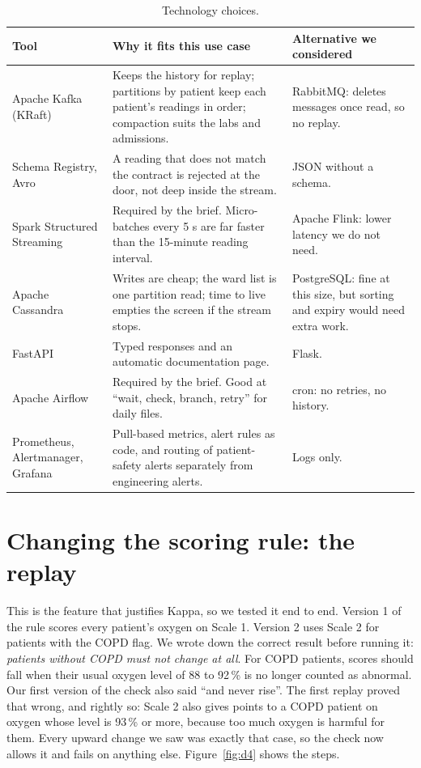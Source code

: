 \documentclass[11pt,a4paper]{article}
\begin{document}
\begin{table}[H]\centering\small
\begin{tabularx}{\linewidth}{|l|X|X|}
\hline
\rowcolor{tablehead}\textbf{Tool} & \textbf{Why it fits this use case} & \textbf{Alternative we considered} \\ \hline
Apache Kafka (KRaft) & Keeps the history for replay; partitions by patient keep
each patient's readings in order; compaction suits the labs and admissions. &
RabbitMQ: deletes messages once read, so no replay. \\ \hline
Schema Registry, Avro & A reading that does not match the contract is rejected at the
door, not deep inside the stream. & JSON without a schema. \\ \hline
Spark Structured Streaming & Required by the brief. Micro-batches every 5 s are far
faster than the 15-minute reading interval. & Apache Flink: lower latency we do not
need. \\ \hline
Apache Cassandra & Writes are cheap; the ward list is one partition read; time to
live empties the screen if the stream stops. & PostgreSQL: fine at this size, but
sorting and expiry would need extra work. \\ \hline
FastAPI & Typed responses and an automatic documentation page. & Flask. \\ \hline
Apache Airflow & Required by the brief. Good at ``wait, check, branch, retry'' for
daily files. & cron: no retries, no history. \\ \hline
Prometheus, Alertmanager, Grafana & Pull-based metrics, alert rules as code, and
routing of patient-safety alerts separately from engineering alerts. & Logs only. \\ \hline
\end{tabularx}
\caption{Technology choices.}\label{tab:tech}
\end{table}

\section{Changing the scoring rule: the replay}\label{sec:replay}

This is the feature that justifies Kappa, so we tested it end to end. Version 1 of the
rule scores every patient's oxygen on Scale 1. Version 2 uses Scale 2 for patients with
the COPD flag. We wrote down the correct result before running it: \emph{patients
without COPD must not change at all}. For COPD patients, scores should fall when their
usual oxygen level of 88 to 92\,\% is no longer counted as abnormal. Our first version
of the check also said ``and never rise''. The first replay proved that wrong, and
rightly so: Scale 2 also gives points to a COPD patient on oxygen whose level is 93\,\%
or more, because too much oxygen is harmful for them. Every upward change we saw was
exactly that case, so the check now allows it and fails on anything else.
Figure~\ref{fig:d4} shows the steps.
\end{document}
